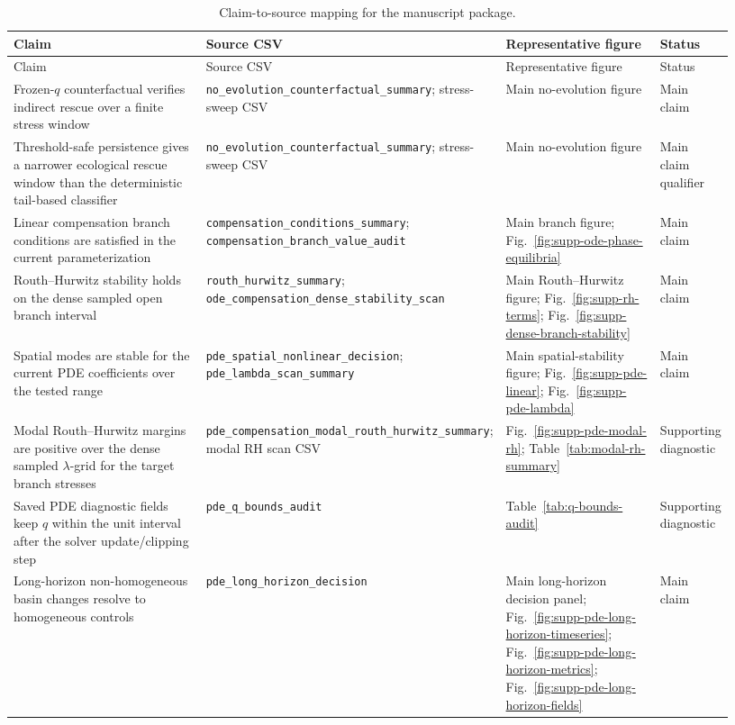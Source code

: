 \documentclass[11pt]{article}
\begin{document}
\begin{landscape}
\scriptsize
\begin{longtable}{L{0.28\linewidth}L{0.33\linewidth}L{0.22\linewidth}L{0.10\linewidth}}
  \caption{Claim-to-source mapping for the manuscript package.}\label{tab:claim-source-map}\\
  \toprule
  Claim & Source CSV & Representative figure & Status \\
  \midrule
  \endfirsthead
  \toprule
  Claim & Source CSV & Representative figure & Status \\
  \midrule
  \endhead
  Frozen-\(q\) counterfactual verifies indirect rescue over a finite stress window & \texttt{no\_evolution\_counterfactual\_summary}; stress-sweep CSV & Main no-evolution figure & Main claim \\
  Threshold-safe persistence gives a narrower ecological rescue window than the deterministic tail-based classifier & \texttt{no\_evolution\_counterfactual\_summary}; stress-sweep CSV & Main no-evolution figure & Main claim qualifier \\
  Linear compensation branch conditions are satisfied in the current parameterization & \texttt{compensation\_conditions\_summary}; \texttt{compensation\_branch\_value\_audit} & Main branch figure; Fig.~\ref{fig:supp-ode-phase-equilibria} & Main claim \\
  Routh--Hurwitz stability holds on the dense sampled open branch interval & \texttt{routh\_hurwitz\_summary}; \texttt{ode\_compensation\_dense\_stability\_scan} & Main Routh--Hurwitz figure; Fig.~\ref{fig:supp-rh-terms}; Fig.~\ref{fig:supp-dense-branch-stability} & Main claim \\
  Spatial modes are stable for the current PDE coefficients over the tested range & \texttt{pde\_spatial\_nonlinear\_decision}; \texttt{pde\_lambda\_scan\_summary} & Main spatial-stability figure; Fig.~\ref{fig:supp-pde-linear}; Fig.~\ref{fig:supp-pde-lambda} & Main claim \\
  Modal Routh--Hurwitz margins are positive over the dense sampled \(\lambda\)-grid for the target branch stresses & \texttt{pde\_compensation\_modal\_routh\_hurwitz\_summary}; modal RH scan CSV & Fig.~\ref{fig:supp-pde-modal-rh}; Table~\ref{tab:modal-rh-summary} & Supporting diagnostic \\
  Saved PDE diagnostic fields keep \(q\) within the unit interval after the solver update/clipping step & \texttt{pde\_q\_bounds\_audit} & Table~\ref{tab:q-bounds-audit} & Supporting diagnostic \\
  Long-horizon non-homogeneous basin changes resolve to homogeneous controls & \texttt{pde\_long\_horizon\_decision} & Main long-horizon decision panel; Fig.~\ref{fig:supp-pde-long-horizon-timeseries}; Fig.~\ref{fig:supp-pde-long-horizon-metrics}; Fig.~\ref{fig:supp-pde-long-horizon-fields} & Main claim \\

\end{longtable}
\end{landscape}
\end{document}
